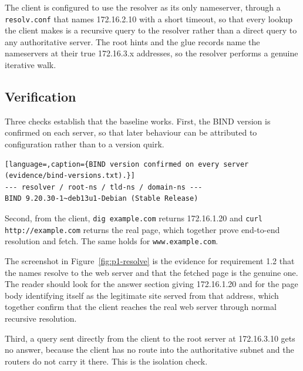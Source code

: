 \documentclass[11pt]{article}
\begin{document}
The client is configured to use the resolver as its only nameserver, through a
\texttt{resolv.conf} that names 172.16.2.10 with a short timeout, so that every
lookup the client makes is a recursive query to the resolver rather than a direct
query to any authoritative server. The root hints and the glue records name the
nameservers at their true 172.16.3.x addresses, so the resolver performs a genuine
iterative walk.

\subsection{Verification}

Three checks establish that the baseline works. First, the BIND version is
confirmed on each server, so that later behaviour can be attributed to
configuration rather than to a version quirk.

\begin{lstlisting}[language=,caption={BIND version confirmed on every server (evidence/bind-versions.txt).}]
--- resolver / root-ns / tld-ns / domain-ns ---
BIND 9.20.30-1~deb13u1-Debian (Stable Release)
\end{lstlisting}

Second, from the client, \texttt{dig example.com} returns 172.16.1.20 and
\texttt{curl http://example.com} returns the real page, which together prove
end-to-end resolution and fetch. The same holds for \texttt{www.example.com}.


The screenshot in Figure~\ref{fig:p1-resolve} is the evidence for requirement 1.2
that the names resolve to the web server and that the fetched page is the genuine
one. The reader should look for the answer section giving 172.16.1.20 and for the
page body identifying itself as the legitimate site served from that address,
which together confirm that the client reaches the real web server through normal
recursive resolution.

Third, a query sent directly from the client to the root server at 172.16.3.10
gets no answer, because the client has no route into the authoritative subnet and
the routers do not carry it there. This is the isolation check.
\end{document}
